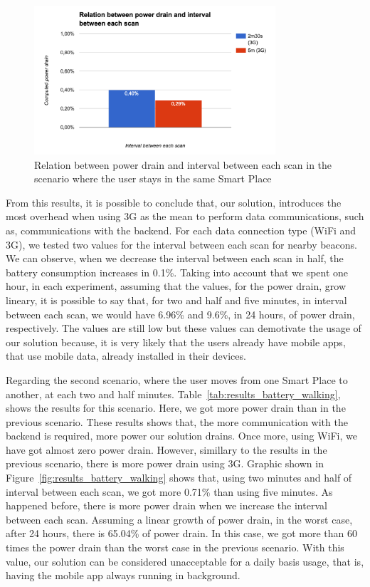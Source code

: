 

\begin{figure}[!ht]
  \centering
    \includegraphics[width=0.8\textwidth, keepaspectratio]{figures/results_battery_stopped}
    \caption[Power drain when the user does not move]{Relation between power drain and interval between each scan in the scenario where the user stays in the same Smart Place}
    \label{fig:results_battery_stopped}
\end{figure}

From this results, it is possible to conclude that, our solution, introduces the most overhead when using \gls{3G} as the mean to perform data communications, such as, communications with the backend.
For each data connection type (\gls{WiFi} and \gls{3G}), we tested two values for the interval between each scan for nearby beacons.
We can observe, when we decrease the interval between each scan in half, the battery consumption increases in 0.1\%.
Taking into account that we spent one hour, in each experiment, assuming that the values, for the power drain, grow lineary, it is possible to say that, for two and half and five minutes, in interval between each scan, we would have 6.96\% and 9.6\%, in 24 hours, of power drain, respectively.
The values are still low but these values can demotivate the usage of our solution because, it is very likely that the users already have mobile apps, that use mobile data, already installed in their devices.

Regarding the second scenario, where the user moves from one Smart Place to another, at each two and half minutes.
Table~\ref{tab:results_battery_walking}, shows the results for this scenario. Here, we got more power drain than in the previous scenario.
These results shows that, the more communication with the backend is required, more power our solution drains.
Once more, using \gls{WiFi}, we have got almost zero power drain.
However, simillary to the results in the previous scenario, there is more power drain using \gls{3G}.
Graphic shown in Figure~\ref{fig:results_battery_walking} shows that, using two minutes and half of interval between each scan, we got more 0.71\% than using five minutes.
As happened before, there is more power drain when we increase the interval between each scan.
Assuming a linear growth of power drain, in the worst case, after 24 hours, there is 65.04\% of power drain.
In this case, we got more than 60 times the power drain than the worst case in the previous scenario.
With this value, our solution can be considered unacceptable for a daily basis usage, that is, having the mobile app always running in background.

